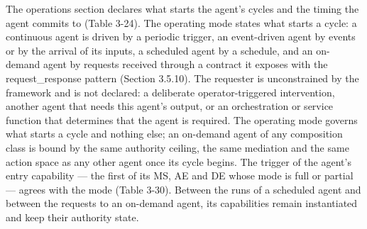 The operations section declares what starts the agent's cycles and the
timing the agent commits to (Table 3-24). The operating mode states what
starts a cycle: a continuous agent is driven by a periodic trigger, an
event-driven agent by events or by the arrival of its inputs, a
scheduled agent by a schedule, and an on-demand agent by requests
received through a contract it exposes with the
request\_\allowbreak{}response pattern (Section 3.5.10). The requester
is unconstrained by the framework and is not declared: a deliberate
operator-triggered intervention, another agent that needs this agent's
output, or an orchestration or service function that determines that the
agent is required. The operating mode governs what starts a cycle and
nothing else; an on-demand agent of any composition class is bound by
the same authority ceiling, the same mediation and the same action space
as any other agent once its cycle begins. The trigger of the agent's
entry capability --- the first of its MS, AE and DE whose mode is full
or partial --- agrees with the mode (Table 3-30). Between the runs of a
scheduled agent and between the requests to an on-demand agent, its
capabilities remain instantiated and keep their authority state.

